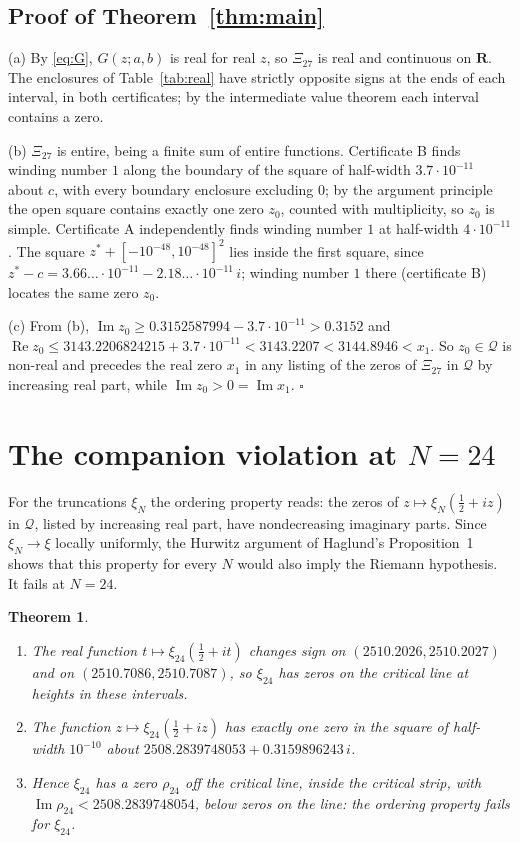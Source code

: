 \documentclass[11pt]{article}
\theoremstyle{plain}
\newtheorem{theorem}{Theorem}[section]
\theoremstyle{definition}
\theoremstyle{remark}
\newcommand{\R}{\mathbf{R}}
\newcommand{\Q}{\mathcal{Q}}
\newcommand{\re}{\operatorname{Re}}
\newcommand{\im}{\operatorname{Im}}
\begin{document}
\subsection{Proof of Theorem~\ref{thm:main}}

(a) By \eqref{eq:G}, $G(z;a,b)$ is real for real $z$, so $\Xi_{27}$ is real and
continuous on $\R$. The enclosures of Table~\ref{tab:real} have strictly
opposite signs at the ends of each interval, in both certificates; by the
intermediate value theorem each interval contains a zero.

(b) $\Xi_{27}$ is entire, being a finite sum of entire functions. Certificate B
finds winding number $1$ along the boundary of the square of half-width
$3.7\cdot10^{-11}$ about $c$, with every boundary enclosure excluding $0$; by the
argument principle the open square contains exactly one zero $z_0$, counted
with multiplicity, so $z_0$ is simple. Certificate A independently finds winding
number $1$ at half-width $4\cdot10^{-11}$. The square
$z^* + [-10^{-48}, 10^{-48}]^2$ lies inside the first square, since
$z^* - c = 3.66\ldots\cdot10^{-11} - 2.18\ldots\cdot10^{-11}\,i$; winding number
$1$ there (certificate B) locates the same zero $z_0$.

(c) From (b), $\im z_0 \ge 0.3152587994 - 3.7\cdot10^{-11} > 0.3152$ and
$\re z_0 \le 3143.2206824215 + 3.7\cdot10^{-11} < 3143.2207 < 3144.8946 < x_1$.
So $z_0 \in \Q$ is non-real and precedes the real zero $x_1$ in any listing of
the zeros of $\Xi_{27}$ in $\Q$ by increasing real part, while
$\im z_0 > 0 = \im x_1$. \hfill$\square$

\section{The companion violation at \texorpdfstring{$N = 24$}{N = 24}}
\label{sec:xi24}

For the truncations $\xi_N$ the ordering property reads: the zeros of
$z \mapsto \xi_N(\tfrac12 + iz)$ in $\Q$, listed by increasing real part, have
nondecreasing imaginary parts. Since $\xi_N \to \xi$ locally uniformly, the
Hurwitz argument of Haglund's Proposition~1 shows that this property for every
$N$ would also imply the Riemann hypothesis. It fails at $N = 24$.

\begin{theorem}\label{thm:xi24}
\begin{enumerate}
\item[(a)] The real function $t \mapsto \xi_{24}(\tfrac12 + it)$ changes sign
on $(2510.2026, 2510.2027)$ and on $(2510.7086, 2510.7087)$, so $\xi_{24}$ has
zeros on the critical line at heights in these intervals.
\item[(b)] The function $z \mapsto \xi_{24}(\tfrac12 + iz)$ has exactly one zero
in the square of half-width $10^{-10}$ about
$2508.2839748053 + 0.3159896243\,i$.
\item[(c)] Hence $\xi_{24}$ has a zero $\rho_{24}$ off the critical line, inside
the critical strip, with $\im\rho_{24} < 2508.2839748054$, below zeros on the
line: the ordering property fails for $\xi_{24}$.
\end{enumerate}
\end{theorem}
\end{document}

